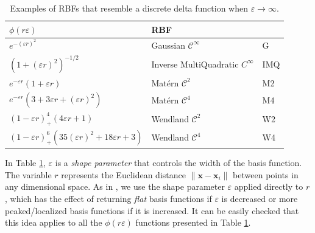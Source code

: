 \documentclass[preprint]{elsarticle}       %
\begin{document}
\begin{table}[h!]
\centering
\begin{tabular}{lll}
\hline
$\phi(r\varepsilon)$& RBF &                                                          \\ \hline
$e^{-  (\varepsilon r)^2}$ & Gaussian $\mathcal{C}^\infty$ & G                                          \\
$\left(1 + (\varepsilon r)^2 \right)^{-1/2}$ & Inverse MultiQuadratic $C^\infty$ & IMQ  \\
$e^{-  \varepsilon r} \left( 1 +   \varepsilon r \right)$ & Mat\'ern $\mathcal{C}^2$ & M2 \\
$e^{-  \varepsilon r} \left( 3 + 3  \varepsilon r +   (\varepsilon r)^2 \right)$ & Mat\'ern $\mathcal{C}^4$ & M4 \\
$(1 -  \varepsilon r)^4_+ \left( 4 \varepsilon r + 1 \right)$ & Wendland $\mathcal{C}^2$ & W2 \\
$(1 -  \varepsilon r)^6_+ \left( 35 (\varepsilon r)^2 + 18 \varepsilon r + 3 \right)$ & Wendland $\mathcal{C}^4$ & W4 \\ \hline
\end{tabular}
\caption{Examples of RBFs that resemble a discrete delta function when $\varepsilon\to\infty$.}\label{tabla1nucleos}
\end{table}

In Table \ref{tabla1nucleos}, $\varepsilon$ is a {\it shape parameter} that controls the width of the basis function. The variable $r$ represents the Euclidean distance $\|\mathbf{x} - \mathbf{x}_i\|$ between points in any dimensional space. As in \cite{Fasshauer2007}, we use the shape parameter $\varepsilon$ applied directly to $r$, which has the effect of returning {\it flat} basis functions if $\varepsilon$ is decreased or more peaked/localized basis functions if it is increased. It can be easily checked that this idea applies to all the $\phi(r\varepsilon)$ functions presented in Table \ref{tabla1nucleos}.
\end{document}
